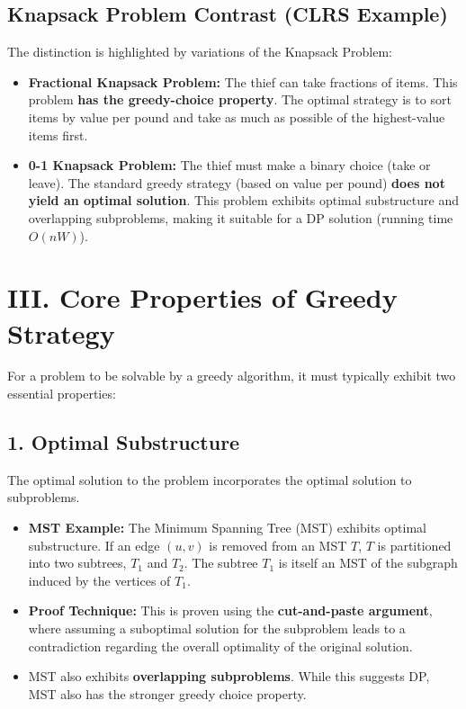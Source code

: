 \documentclass{article}
\begin{document}
\subsection*{Knapsack Problem Contrast (CLRS Example)}

The distinction is highlighted by variations of the Knapsack Problem:
\begin{itemize}
    \item \textbf{Fractional Knapsack Problem:} The thief can take fractions of items. This problem \textbf{has the greedy-choice property}. The optimal strategy is to sort items by value per pound and take as much as possible of the highest-value items first.
    \item \textbf{0-1 Knapsack Problem:} The thief must make a binary choice (take or leave). The standard greedy strategy (based on value per pound) \textbf{does not yield an optimal solution}. This problem exhibits optimal substructure and overlapping subproblems, making it suitable for a DP solution (running time $O(nW)$).
\end{itemize}

\section{III. Core Properties of Greedy Strategy}

For a problem to be solvable by a greedy algorithm, it must typically exhibit two essential properties:

\subsection{1. Optimal Substructure}
The optimal solution to the problem incorporates the optimal solution to subproblems.
\begin{itemize}
    \item \textbf{MST Example:} The Minimum Spanning Tree (MST) exhibits optimal substructure. If an edge $(u, v)$ is removed from an MST $T$, $T$ is partitioned into two subtrees, $T_1$ and $T_2$. The subtree $T_1$ is itself an MST of the subgraph induced by the vertices of $T_1$.
    \item \textbf{Proof Technique:} This is proven using the \textbf{cut-and-paste argument}, where assuming a suboptimal solution for the subproblem leads to a contradiction regarding the overall optimality of the original solution.
    \item MST also exhibits \textbf{overlapping subproblems}. While this suggests DP, MST also has the stronger greedy choice property.
\end{itemize}
\end{document}
